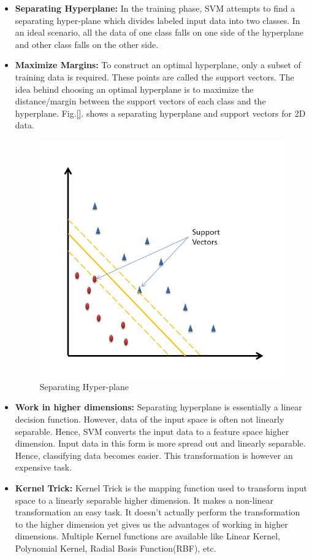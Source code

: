 \begin{itemize}
	\item \textbf{Separating Hyperplane:} In the training phase, SVM attempts to find a separating hyper-plane which divides labeled input data into two classes. In an ideal scenario, all the data of one class falls on one side of the hyperplane and other class falls on the other side. 
	
	\item \textbf{Maximize Margins:} To construct an optimal hyperplane, only a subset of training data is required. These points are called the support vectors. The idea behind choosing an optimal hyperplane is to maximize the distance/margin between the support vectors of each class and the hyperplane. Fig.\ref{}. shows a separating hyperplane and support vectors for 2D data.
	\begin{figure}[htb]
		\centering
		\includegraphics[scale=0.7]{images/svm-hyperplane}
		\caption{Separating Hyper-plane}
		\label{fig:svm_hyperplane}
	\end{figure} 
	
	
	\item \textbf{Work in higher dimensions:} Separating hyperplane is essentially a linear decision function. However, data of the input space is often not linearly separable. Hence, SVM converts the input data to a feature space higher dimension. Input data in this form is more spread out and linearly separable. Hence, classifying data becomes easier. This transformation is however an expensive task.
	
	\item \textbf{Kernel Trick:} Kernel Trick is the mapping function used to transform input space to a linearly separable higher dimension. It makes a non-linear transformation an easy task. It doesn't actually perform the transformation to the higher dimension yet gives us the advantages of working in higher dimensions. Multiple Kernel functions are available like Linear Kernel, Polynomial Kernel, Radial Basis Function(RBF), etc.
	
\end{itemize}
